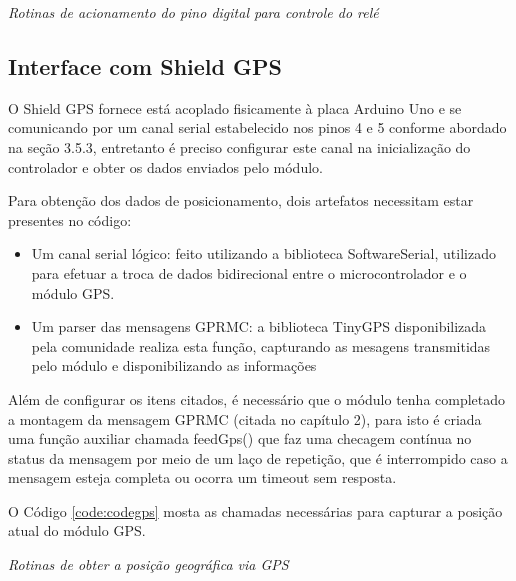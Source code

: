 \renewcommand{\baselinestretch}{0.5}  %
\begin{codigo}[htb]
\fontsize{9pt}{9pt}\selectfont
      \begin{boxit}  %
      \vspace{2mm}
   \end{boxit}
   \caption{\it Rotinas de acionamento do pino digital para controle do relé}
   \label{code:ctrlrelay}
\end{codigo}
  

\subsection{Interface com Shield GPS}

O Shield GPS fornece está acoplado fisicamente à placa Arduino Uno e se comunicando por um canal serial estabelecido nos pinos 4 e 5 conforme abordado na seção 3.5.3, entretanto é preciso configurar este canal na inicialização do controlador e obter os dados enviados pelo módulo.

Para obtenção dos dados de posicionamento, dois artefatos necessitam estar presentes no código: 

\begin{itemize}
	\item Um canal serial lógico: feito utilizando a biblioteca SoftwareSerial, utilizado para efetuar a troca de dados bidirecional entre o microcontrolador e o módulo GPS.
	\item Um parser das mensagens GPRMC: a biblioteca TinyGPS disponibilizada pela comunidade realiza esta função, capturando as mesagens transmitidas pelo módulo e disponibilizando as informações 
\end{itemize}

Além de configurar os itens citados, é necessário que o módulo tenha completado a montagem da mensagem GPRMC (citada no capítulo 2), para isto é criada uma função auxiliar chamada feedGps() que faz uma checagem contínua no status da mensagem por meio de um laço de repetição, que é interrompido caso a mensagem esteja completa ou ocorra um timeout sem resposta.

O Código \ref{code:codegps} mosta as chamadas necessárias para capturar a posição atual do módulo GPS.

\renewcommand{\baselinestretch}{0.5}  %
\begin{codigo}[htb]
\fontsize{9pt}{9pt}\selectfont
      \begin{boxit}  %
      \vspace{2mm}
   \end{boxit}
   \caption{\it Rotinas de obter a posição geográfica via GPS}
   \label{code:codegps}
\end{codigo}

